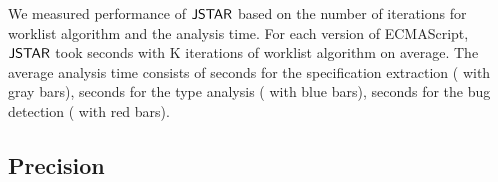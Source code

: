 We measured performance of $\tool$ based on the number of iterations for
worklist algorithm and the analysis time.  For each version of ECMAScript,
$\tool$ took  seconds with K iterations of worklist
algorithm on average.  The average analysis time consists of  seconds
for the specification extraction ( with gray bars),
 seconds for the type analysis ( with blue bars),
 seconds for the bug detection ( with red bars).


\subsection{Precision}\label{sec:precision}

% 
% 
% 

